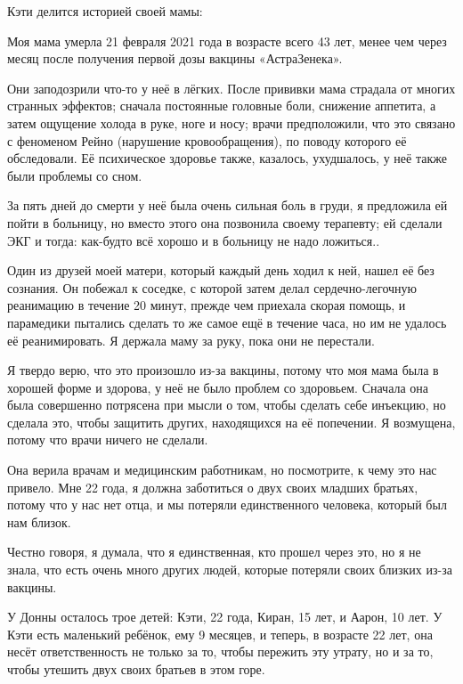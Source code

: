 Кэти делится историей своей мамы:

Моя мама умерла 21 февраля 2021 года в возрасте всего 43 лет, менее чем через
месяц после получения первой дозы вакцины «АстраЗенека».

Они заподозрили что-то у неё в лёгких. После прививки мама страдала от многих
странных эффектов; сначала постоянные головные боли, снижение аппетита, а затем
ощущение холода в руке, ноге и носу; врачи предположили, что это связано с
феноменом Рейно (нарушение кровообращения), по поводу которого её
обследовали. Её психическое здоровье также, казалось, ухудшалось, у неё также
были проблемы со сном.

За пять дней до смерти у неё была очень сильная боль в груди, я предложила ей
пойти в больницу, но вместо этого она позвонила своему терапевту; ей сделали ЭКГ
и тогда: как-будто всё хорошо и в больницу не надо ложиться..

Один из друзей моей матери, который каждый день ходил к ней, нашел её без
сознания. Он побежал к соседке, с которой затем делал сердечно-легочную
реанимацию в течение 20 минут, прежде чем приехала скорая помощь, и парамедики
пытались сделать то же самое ещё в течение часа, но им не удалось её
реанимировать. Я держала маму за руку, пока они не перестали.

Я твердо верю, что это произошло из-за вакцины, потому что моя мама была в
хорошей форме и здорова, у неё не было проблем со здоровьем. Сначала она была
совершенно потрясена при мысли о том, чтобы сделать себе инъекцию, но сделала
это, чтобы защитить других, находящихся на её попечении. Я возмущена, потому что
врачи ничего не сделали.

Она верила врачам и медицинским работникам, но посмотрите, к чему это нас
привело. Мне 22 года, я должна заботиться о двух своих младших братьях, потому
что у нас нет отца, и мы потеряли единственного человека, который был нам
близок.

Честно говоря, я думала, что я единственная, кто прошел через это, но я не
знала, что есть очень много других людей, которые потеряли своих близких из-за
вакцины.

У Донны осталось трое детей: Кэти, 22 года, Киран, 15 лет, и Аарон, 10 лет. У
Кэти есть маленький ребёнок, ему 9 месяцев, и теперь, в возрасте 22 лет, она
несёт ответственность не только за то, чтобы пережить эту утрату, но и за то,
чтобы утешить двух своих братьев в этом горе.
